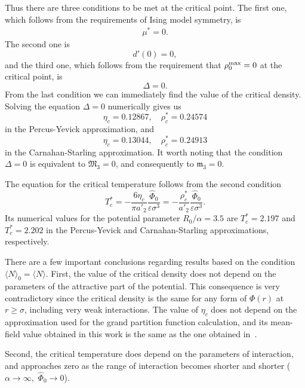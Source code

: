 Thus there are three conditions to be met at the critical point. The first one, which follows from the requirements of Ising model symmetry, is
\begin{eqnarray}
	\mu^* = 0.
\end{eqnarray}
The second one is
\begin{equation}
	d'(0) = 0,
\end{equation}
and the third one, which follows from the requirement that $\rho_0^{\rm{max}} = 0$ at the critical point, is
\begin{equation}
	\Delta = 0.
\end{equation}
From the last condition we can immediately find the value of the critical density. Solving the equation $\Delta = 0$ numerically gives us 
\begin{equation}
	\eta_c = 0.12867, \quad \rho^*_c = 0.24574
\end{equation}
in the Percus-Yevick approximation, and
\begin{equation}
	\eta_c = 0.13044, \quad \rho^*_c = 0.24913
\end{equation}
in the Carnahan-Starling approximation.
It worth noting that the condition $\Delta = 0$ is equivalent to $\mathfrak{M}_3=0$, and consequently to $\mathfrak{m}_3 = 0.$

The equation for the critical temperature follows from the second condition
\begin{equation}
	\label{T_c_Delta}
	T^*_c = -\frac{6\eta_c}{\pi a'_2} \frac{\hat{\Phi}_0}{\varepsilon\sigma^3} = -\frac{\rho^*_c}{a'_2} \frac{\hat{\Phi}_0}{\varepsilon\sigma^3}.
\end{equation}
Its numerical values for the potential parameter $R_0/\alpha = 3.5$ are $T^*_c=2.197$ and $T^*_c=2.202$ in the Percus-Yevick and Carnahan-Starling approximations, respectively.

There are a few important conclusions regarding results based on the condition $\langle N \rangle_0 = \langle N \rangle$. First, the value of the critical density does not depend on the parameters of the attractive part of the potential. This consequence is very contradictory since the critical density is the same for any form of $\Phi(r)$ at $r\geq \sigma$, including very weak interactions. 
The value of $\eta_c$ does not depend on the approximation used for the grand partition function calculation, and its mean-field value obtained in this work is the same as the one obtained in~\cite{YukhJSP1995}.

Second, the critical temperature does depend on the parameters of interaction, and approaches zero as the range of interaction becomes shorter and shorter ($\alpha \to \infty,$ $\hat{\Phi}_0 \to 0$).

